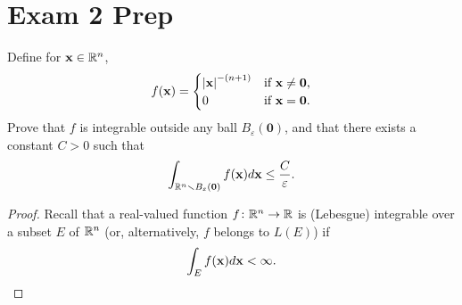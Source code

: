 \section{Exam 2 Prep}
\begin{problem}
Define for $\mathbf{x}\in\mathbb{R}^n$,
\[
f(\mathbf{x})=
\begin{cases}
\left|\mathbf{x}\right|^{-(n+1)}&\text{if $\mathbf{x}\neq \mathbf{0}$,}\\
0&\text{if $\mathbf{x}=\mathbf{0}$.}
\end{cases}
\]
Prove that $f$ is integrable outside any ball $B_\varepsilon(\mathbf{0})$,
and that there exists a constant $C>0$ such that
\[
\int_{\mathbb{R}^n\smallsetminus B_\varepsilon(\mathbf{0})}f(\mathbf{x}) d \mathbf{x}\leq\frac{C}{\varepsilon}.
\]
\end{problem}
\begin{proof}
Recall that a real-valued function $f\colon\mathbb{R}^n\to\mathbb{R}$ is (Lebesgue)
integrable over a subset $E$ of $\mathbb{R}^n$ (or, alternatively, $f$ belongs to
$L(E)$) if
\[
\int_E f(\mathbf{x}) d \mathbf{x}<\infty.
\]


\end{proof}
